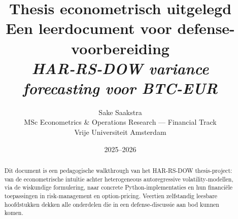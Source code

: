 \documentclass[11pt,a4paper]{article}
\title{
    \vspace{-1cm}
    \Large\textbf{Thesis econometrisch uitgelegd}\\[0.3em]
    \large Een leerdocument voor defense-voorbereiding\\[0.5em]
    \normalsize\textit{HAR-RS-DOW variance forecasting voor BTC-EUR}
}
\author{
    Sake Saakstra\\
    \small MSc Econometrics \& Operations Research --- Financial Track\\
    \small Vrije Universiteit Amsterdam
}
\date{2025--2026}
\begin{document}
\maketitle

\begin{abstract}
\noindent Dit document is een pedagogische walkthrough van het HAR-RS-DOW thesis-project: van de econometrische intuïtie achter heterogeneous autoregressive volatility-modellen, via de wiskundige formulering, naar concrete Python-implementaties en hun financiële toepassingen in risk-management en option-pricing. Veertien zelfstandig leesbare hoofdstukken dekken alle onderdelen die in een defense-discussie aan bod kunnen komen.
\end{abstract}

\tableofcontents
\newpage



\end{document}
